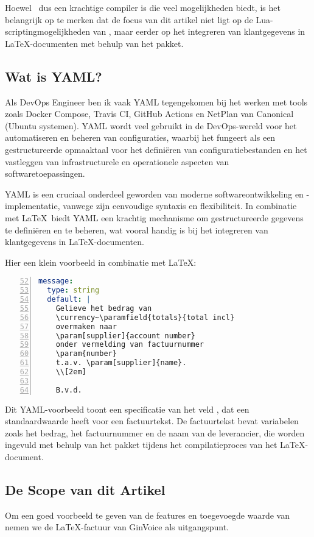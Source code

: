 Hoewel \LuaLaTeX\ dus een krachtige compiler is die veel mogelijkheden biedt, is het belangrijk op te merken dat de focus van dit artikel niet ligt op de Lua-scriptingmogelijkheden van \LuaLaTeX, maar eerder op het integreren van klantgegevens in LaTeX-documenten met behulp van het  pakket.

\subsection{Wat is YAML?}
Als DevOps Engineer ben ik vaak YAML tegengekomen bij het werken met tools zoals Docker Compose, Travis CI, GitHub Actions en NetPlan van Canonical (Ubuntu systemen).
YAML wordt veel gebruikt in de DevOps-wereld voor het automatiseren en beheren van configuraties, waarbij het fungeert als een gestructureerde opmaaktaal voor het definiëren van configuratiebestanden en het vastleggen van infrastructurele en operationele aspecten van softwaretoepassingen.

YAML is een cruciaal onderdeel geworden van moderne softwareontwikkeling en -implementatie, vanwege zijn eenvoudige syntaxis en flexibiliteit.
In combinatie met \LaTeX\ biedt YAML een krachtig mechanisme om gestructureerde gegevens te definiëren en te beheren, wat vooral handig is bij het integreren van klantgegevens in LaTeX-documenten.

\noindent
Hier een klein voorbeeld in combinatie met \LaTeX:

\begin{lstlisting}[language=YAML,numbers=left,xleftmargin=15pt,caption={\ttfamily recipes/invoice.yaml},firstnumber=52]
message:
  type: string
  default: |
    Gelieve het bedrag van
    \currency~\paramfield{totals}{total incl}
    overmaken naar
    \param[supplier]{account number}
    onder vermelding van factuurnummer
    \param{number}
    t.a.v. \param[supplier]{name}.
    \\[2em]

    B.v.d.

\end{lstlisting}
Dit YAML-voorbeeld toont een specificatie van het veld , dat een standaardwaarde heeft voor een factuurtekst.
De factuurtekst bevat variabelen zoals het bedrag, het factuurnummer en de naam van de leverancier, die worden ingevuld met behulp van het  pakket tijdens het compilatieproces van het LaTeX-document.

\subsection{De Scope van dit Artikel}
Om een goed voorbeeld te geven van de features en toegevoegde waarde van  nemen we de \LaTeX-factuur van GinVoice als uitgangspunt.

